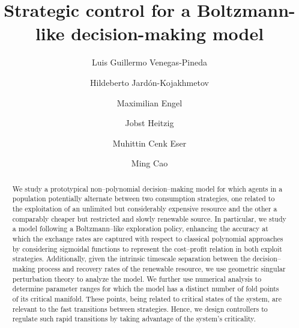\documentclass[3p]{elsarticle}
\theoremstyle{plain}
\theoremstyle{remark}
\theoremstyle{definition}
\begin{document}
\begin{frontmatter}
\title{Strategic control for a Boltzmann-like decision-making model}
\author[1]{Luis Guillermo Venegas-Pineda}
\author[1]{Hildeberto Jard\'on-Kojakhmetov}
\author[2,3]{Maximilian Engel}
\author[4]{Jobst Heitzig}
\author[2]{Muhittin Cenk Eser}
\author[5]{Ming Cao}

\begin{abstract}
 We study a prototypical non--polynomial decision--making model for which agents in a population potentially alternate between two consumption strategies, one related to the exploitation of an unlimited but considerably expensive resource and the other a comparably cheaper but restricted and slowly renewable source. In particular, we study a model following a Boltzmann--like exploration policy, enhancing the accuracy at which the exchange rates are captured with respect to classical polynomial approaches by considering sigmoidal functions to represent the cost--profit relation in both exploit strategies. Additionally, given the intrinsic timescale separation between the decision--making process and recovery rates of the renewable resource, we use geometric singular perturbation theory to analyze the model. We further use numerical analysis to determine parameter ranges for which the model has a distinct number of fold points of its critical manifold. These points, being related to critical states of the system, are relevant to the fast transitions between strategies. Hence, we design controllers to regulate such rapid transitions by taking advantage of the system's criticality.
\end{abstract}
\end{frontmatter}
\end{document}
